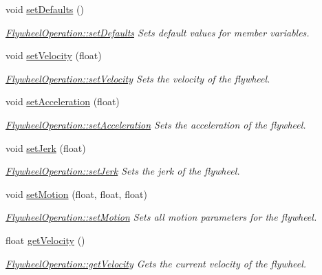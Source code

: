 \begin{DoxyCompactItemize}
void \hyperlink{class_flywheel_operation_a23b72640fdedd6d89575ea9a4ef3c69a}{set\+Defaults} ()
\begin{DoxyCompactList}\small\item\em \hyperlink{class_flywheel_operation_a23b72640fdedd6d89575ea9a4ef3c69a}{Flywheel\+Operation\+::set\+Defaults} Sets default values for member variables. \end{DoxyCompactList}\item 
void \hyperlink{class_flywheel_operation_a30e26868333a6a7d73ae34156ba432a8}{set\+Velocity} (float)
\begin{DoxyCompactList}\small\item\em \hyperlink{class_flywheel_operation_a30e26868333a6a7d73ae34156ba432a8}{Flywheel\+Operation\+::set\+Velocity} Sets the velocity of the flywheel. \end{DoxyCompactList}\item 
void \hyperlink{class_flywheel_operation_a307929c750339cb2b46baaafa526d29f}{set\+Acceleration} (float)
\begin{DoxyCompactList}\small\item\em \hyperlink{class_flywheel_operation_a307929c750339cb2b46baaafa526d29f}{Flywheel\+Operation\+::set\+Acceleration} Sets the acceleration of the flywheel. \end{DoxyCompactList}\item 
void \hyperlink{class_flywheel_operation_a4f14dfe672793f37e21f90ecab499378}{set\+Jerk} (float)
\begin{DoxyCompactList}\small\item\em \hyperlink{class_flywheel_operation_a4f14dfe672793f37e21f90ecab499378}{Flywheel\+Operation\+::set\+Jerk} Sets the jerk of the flywheel. \end{DoxyCompactList}\item 
void \hyperlink{class_flywheel_operation_a9bcbe2d59c2a14c08b9b34d2e0c63023}{set\+Motion} (float, float, float)
\begin{DoxyCompactList}\small\item\em \hyperlink{class_flywheel_operation_a9bcbe2d59c2a14c08b9b34d2e0c63023}{Flywheel\+Operation\+::set\+Motion} Sets all motion parameters for the flywheel. \end{DoxyCompactList}\item 
float \hyperlink{class_flywheel_operation_a06119af2250971d23869d94fd451ceba}{get\+Velocity} ()
\begin{DoxyCompactList}\small\item\em \hyperlink{class_flywheel_operation_a06119af2250971d23869d94fd451ceba}{Flywheel\+Operation\+::get\+Velocity} Gets the current velocity of the flywheel. \end{DoxyCompactList}\item 

\end{DoxyCompactItemize}
